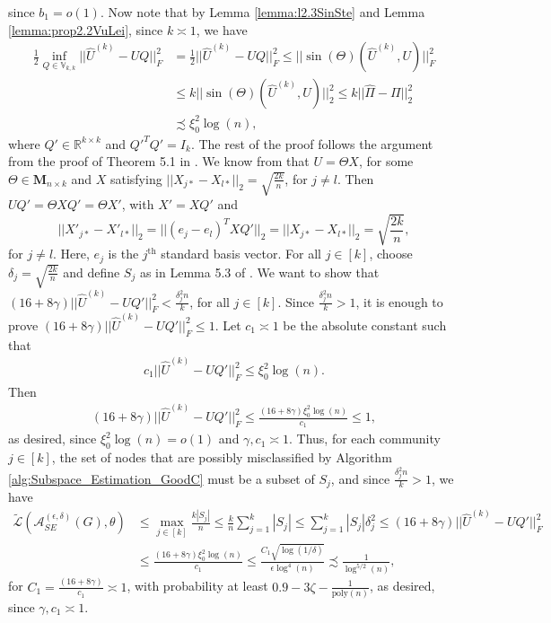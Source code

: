 \documentclass{article}
\begin{document}
since $b_1 = o(1)$. Now note that by Lemma \ref{lemma:l2.3SinSte} and Lemma \ref{lemma:prop2.2VuLei}, since $k \asymp 1$, we have
\begin{align*}
\frac{1}{2}\inf\limits_{Q \in \mathbb{V}_{k, k}}||\hat{U}^{(k)} - UQ||_F^2 & = \frac{1}{2}||\hat{U}^{(k)} - UQ||_F^2 \leq ||\sin(\Theta)(\hat{U}^{(k)}, U)||_F^2 \\
%
& \leq k||\sin(\Theta)(\hat{U}^{(k)}, U)||_2^2 \leq k||\hat{\Pi} - \Pi||_2^2 \\
%
& \precsim \xi_0^2\log(n),   
\end{align*}
where $Q' \in \mathbb{R}^{k \times k}$ and $Q'^TQ' = I_k$. The rest of the proof follows the argument from the proof of Theorem 5.1 in \cite{HehEtal22}. We know from \cite{LeiRin15} that $U = \Theta X$, for some $\Theta \in \mathbf{M}_{n\times k}$ and $X$ satisfying $||X_{j*} - X_{l*}||_2 = \sqrt{\frac{2k}{n}}$, for $j \neq l$. Then $UQ' = \Theta XQ' = \Theta X'$, with $X' = XQ'$ and
\begin{equation*}
||X'_{j*} - X'_{l*}||_2 = ||(e_j- e_l)^TXQ'||_2 = ||X_{j*} - X_{l*}||_2 = \sqrt{\frac{2k}{n}},
\end{equation*}
for $j \neq l$. Here, $e_j$ is the $j^{\text{th}}$ standard basis vector. For all $j \in [k]$, choose $\delta_j = \sqrt{\frac{2k}{n}}$ and define $S_j$ as in Lemma 5.3 of \cite{LeiRin15}. We want to show that $(16 + 8\gamma)||\hat{U}^{(k)} - UQ'||_F^2 < \frac{\delta_j^2n}{k}$, for all $j \in [k]$. Since $\frac{\delta_j^2n}{k} > 1$, it is enough to prove $(16 + 8\gamma)||\hat{U}^{(k)} - UQ'||_F^2 \leq 1$. Let $c_1 \asymp 1$ be the absolute constant such that
\begin{align*}
c_1||\hat{U}^{(k)} - UQ'||_F^2 \leq \xi_0^2\log(n).   
\end{align*}
Then
\begin{align*}
(16 + 8\gamma)||\hat{U}^{(k)} - UQ'||_F^2 \leq \frac{(16 + 8\gamma)\xi_0^2\log(n)}{c_1} \leq 1, 
\end{align*}
as desired, since $\xi_0^2\log(n) = o(1)$ and $\gamma, c_1 \asymp 1$. Thus, for each
community $j \in [k]$, the set of nodes that are possibly misclassified by Algorithm \ref{alg:Subspace_Estimation_GoodC} must be a subset of $S_j$, and since $\frac{\delta_j^2n}{k} > 1$, we have
\begin{align*}
\widetilde{\mathcal{L}}\left(\mathcal{A}_{SE}^{(\epsilon, \delta)}(G), \theta\right) &\leq \mathop{\max}_{j \in [k]}\frac{k|S_j|}{n} \leq \frac{k}{n}\sum_{j = 1}^k|S_j| \leq \sum_{j = 1}^k|S_j|\delta_j^2 \leq (16 + 8\gamma)||\hat{U}^{(k)} - UQ'||_F^2\\
&\leq \frac{(16 + 8\gamma)\xi_0^2\log(n)}{c_1} \leq \frac{C_1\sqrt{\log(1/\delta)}}{\epsilon\log^4(n)} \precsim \frac{1}{\log^{5/2}(n)},
\end{align*}
for $C_1 = \frac{(16 + 8\gamma)}{c_1} \asymp 1$, with probability at least $0.9 - 3\zeta - \frac{1}{\mathrm{poly}(n)}$, as desired, since $\gamma, c_1 \asymp 1$.
\end{document}
